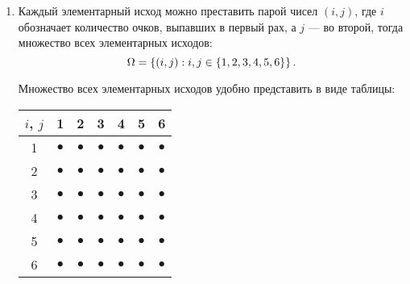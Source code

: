 \begin{enumerate}
    \item
    Каждый элементарный исход можно преставить парой чисел $(i, j)$, где $i$ обозначает количество очков, выпавших в первый рах, а $j$ --- во второй, тогда множество всех элементарных
    исходов:
    \begin{equation}
        \Omega = \left \{ (i, j) : i, j \in \left \{ 1, 2, 3, 4, 5, 6 \right \} \right \}.
    \end{equation}

    Множество всех элементарных исходов удобно представить в виде таблицы:
    \begin{center}
        \begin{tabular}{c|c|c|c|c|c|c|}
            $i$, $j$ & 1         & 2         & 3         & 4         & 5         & 6         \\
            \hline
            1        & $\bullet$ & $\bullet$ & $\bullet$ & $\bullet$ & $\bullet$ & $\bullet$ \\
            \hline
            2        & $\bullet$ & $\bullet$ & $\bullet$ & $\bullet$ & $\bullet$ & $\bullet$ \\
            \hline
            3        & $\bullet$ & $\bullet$ & $\bullet$ & $\bullet$ & $\bullet$ & $\bullet$ \\
            \hline
            4        & $\bullet$ & $\bullet$ & $\bullet$ & $\bullet$ & $\bullet$ & $\bullet$ \\
            \hline
            5        & $\bullet$ & $\bullet$ & $\bullet$ & $\bullet$ & $\bullet$ & $\bullet$ \\
            \hline
            6        & $\bullet$ & $\bullet$ & $\bullet$ & $\bullet$ & $\bullet$ & $\bullet$ \\
            \hline
        \end{tabular}
    \end{center}


\end{enumerate}
